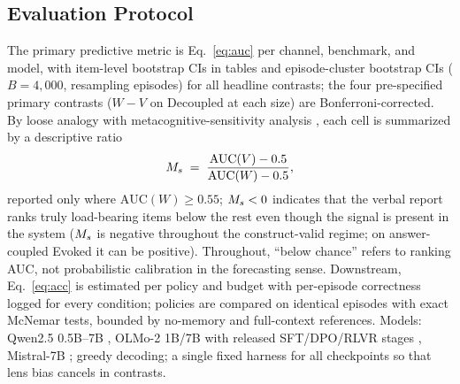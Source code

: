 \subsection{Evaluation Protocol}
\label{sec:protocol}

The primary predictive metric is Eq.~\eqref{eq:auc} per channel, benchmark, and
model, with item-level bootstrap CIs in tables and episode-cluster bootstrap
CIs ($B{=}4{,}000$, resampling episodes) for all headline contrasts; the four
pre-specified primary contrasts ($W{-}V$ on Decoupled at each size) are
Bonferroni-corrected. By loose analogy with metacognitive-sensitivity analysis
\citep{fleming2014how}, each cell is summarized by a descriptive ratio
\begin{equation}
M_s \;=\; \frac{\mathrm{AUC}(V) - 0.5}{\mathrm{AUC}(W) - 0.5},
\label{eq:ms}
\end{equation}
reported only where $\mathrm{AUC}(W)\ge 0.55$; $M_s<0$ indicates that the
verbal report ranks truly load-bearing items below the rest even though the
signal is present in the system ($M_s$ is negative throughout the
construct-valid regime; on answer-coupled Evoked it can be positive). Throughout, ``below chance'' refers to
ranking AUC, not probabilistic calibration in the forecasting sense.
Downstream, Eq.~\eqref{eq:acc} is estimated per policy and budget with
per-episode correctness logged for every condition; policies are compared on
identical episodes with exact McNemar tests, bounded by no-memory and
full-context references. Models: Qwen2.5 0.5B--7B \citep{qwen2025}, OLMo-2
1B/7B with released SFT/DPO/RLVR stages \citep{olmo2}, Mistral-7B
\citep{jiang2023mistral}; greedy decoding; a single fixed harness for all
checkpoints so that lens bias cancels in contrasts.
